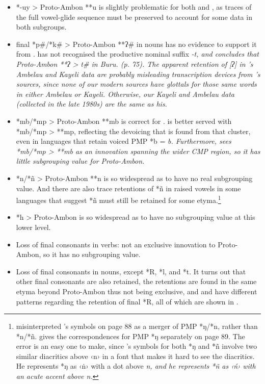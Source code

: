 \begin{itemize}
\item *-uy > Proto-Ambon **u is slightly problematic for both 
and , as traces of the full vowel-glide sequence
must be preserved to account for some data in both subgroups.

\item final *p{\#}/*k{\#} > Proto-Ambon **ʔ{\#} in nouns has no evidence
to support it from .
\citeauthor{Stresemann1927} has not recognised the productive nominal suffix \it{-t},
and concludes that Proto-Ambon **ʔ > \it{t}{\#} in Buru. (p.
75). The apparent retention of [ʔ] in \citeauthor{Stresemann1927}’s Ambelau
and Kayeli data are probably misleading transcription devices
from \citeauthor{Stresemann1927}’s sources, since none of our modern sources have glottals for those same
words in either Ambelau or Kayeli.
Otherwise, our Kayeli and Ambelau data (collected in the late
1980s) are the same as his.

\item *mb/*mp > Proto-Ambon **mb is correct for .
 is better served with *mb/*mp > **mp,
reflecting the devoicing that is found from that cluster,
even in languages that retain voiced PMP *b = \it{b}.
Furthermore, \citet[26]{Blust1981} sees *mb/*mp > **mb as an
innovation spanning the wider CMP region,
so it has little subgrouping value for Proto-Ambon.

\item *n/*ñ > Proto-Ambon **n is so widespread as to have no real subgrouping value.
And there are also trace retentions of *ñ in raised vowels in
some languages that suggest *ñ must still be retained for some
etyma.\footnote{
		\citet[12]{Collins1983} misinterpreted
		\citeauthor{Stresemann1927}'s \citeyear{Stresemann1927}
		symbols on page 88 as a merger of PMP *ŋ/*n, rather than *n/*ñ.
		\citeauthor{Stresemann1927} gives the correspondences for PMP *ŋ separately on page 89.
		The error is an easy one to make,
		since \citeauthor{Stresemann1927}'s symbols for both *ŋ
		and *ñ involve two similar diacritics above ‹n› in a font
		that makes it hard to see the diacritics.
		He represents *ŋ as ‹ṅ› with a dot above \it{n},
		and he represents *ñ as ‹ń› with an acute accent above \it{n}.}

\item *h > Proto-Ambon {\0} is so widespread as to have no subgrouping
value at this lower level.

\item Loss of final consonants in verbs: not an exclusive innovation
to Proto-Ambon, so it has no subgrouping value.

\item Loss of final consonants in nouns,
except *R, *l, and *t.
It turns out that other final consonants are also retained,
the retentions are found in the same etyma beyond Proto-Ambon
thus not being exclusive,
and  and  have different patterns
regarding the retention of final *R,
all of which are shown in .
\end{itemize}

